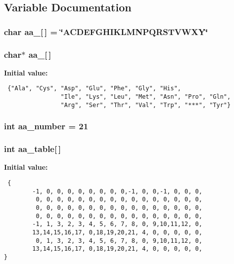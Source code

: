 \subsection{Variable Documentation}
\subsubsection{\setlength{\rightskip}{0pt plus 5cm}char aa\_[$\,$] = \char`\"{}ACDEFGHIKLMNPQRSTVWXY\char`\"{}}\label{P__global_8h_a0}


\subsubsection{\setlength{\rightskip}{0pt plus 5cm}char$\ast$ aa\_[$\,$]}\label{P__global_8h_a2}


{\bf Initial value:}

\footnotesize\begin{verbatim} {"Ala", "Cys", "Asp", "Glu", "Phe", "Gly", "His",
                "Ile", "Lys", "Leu", "Met", "Asn", "Pro", "Gln",
                "Arg", "Ser", "Thr", "Val", "Trp", "***", "Tyr"}\end{verbatim}\normalsize 
{}
\subsubsection{\setlength{\rightskip}{0pt plus 5cm}int aa\_\-number = 21}\label{P__global_8h_a1}


\subsubsection{\setlength{\rightskip}{0pt plus 5cm}int aa\_\-table[$\,$]}\label{P__global_8h_a3}


{\bf Initial value:}

\footnotesize\begin{verbatim} {
        -1, 0, 0, 0, 0, 0, 0, 0, 0,-1, 0, 0,-1, 0, 0, 0,
         0, 0, 0, 0, 0, 0, 0, 0, 0, 0, 0, 0, 0, 0, 0, 0,
         0, 0, 0, 0, 0, 0, 0, 0, 0, 0, 0, 0, 0, 0, 0, 0,
         0, 0, 0, 0, 0, 0, 0, 0, 0, 0, 0, 0, 0, 0, 0, 0,
        -1, 1, 3, 2, 3, 4, 5, 6, 7, 8, 0, 9,10,11,12, 0,
        13,14,15,16,17, 0,18,19,20,21, 4, 0, 0, 0, 0, 0,
         0, 1, 3, 2, 3, 4, 5, 6, 7, 8, 0, 9,10,11,12, 0,
        13,14,15,16,17, 0,18,19,20,21, 4, 0, 0, 0, 0, 0,
}\end{verbatim}\normalsize 
